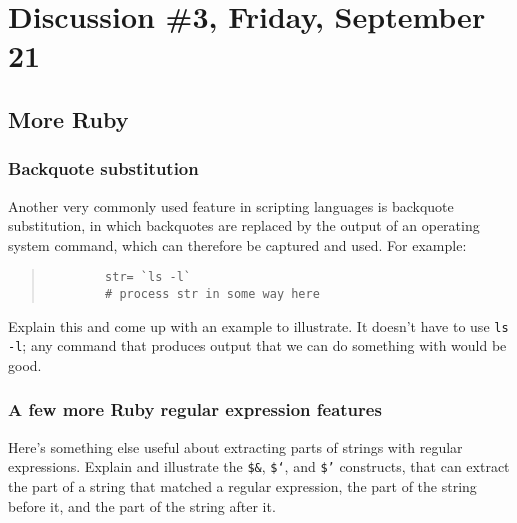 \documentclass[12pt]{article}
\begin{document}

  \section{Discussion \#3, Friday, September 21}

    \subsection{More Ruby}
  
      \subsubsection{Backquote substitution}
  
        Another very commonly used feature in scripting languages is backquote
      substitution, in which backquotes are replaced by the output of an
      operating system command, which can therefore be captured and used.
      For example:
  
        \vspace{-2.5mm}
  
        \begin{quote}
  
          \begin{Verbatim}
        str= `ls -l`
        # process str in some way here
          \end{Verbatim}
  
        \end{quote}
  
        \vspace{-1.5mm}
  
        Explain this and come up with an example to illustrate.  It doesn't
      have to use \texttt{ls -l}; any command that produces output that we
      can do something with would be good.
  
      \subsubsection{A few more Ruby regular expression features}
  
        Here's something else useful about extracting parts of strings with
      regular expressions.  Explain and illustrate the \texttt{\$\&},
      \texttt{\$`}, and \texttt{\$'} constructs, that can extract the part
      of a string that matched a regular expression, the part of the string
      before it, and the part of the string after it.
  
\end{document}
